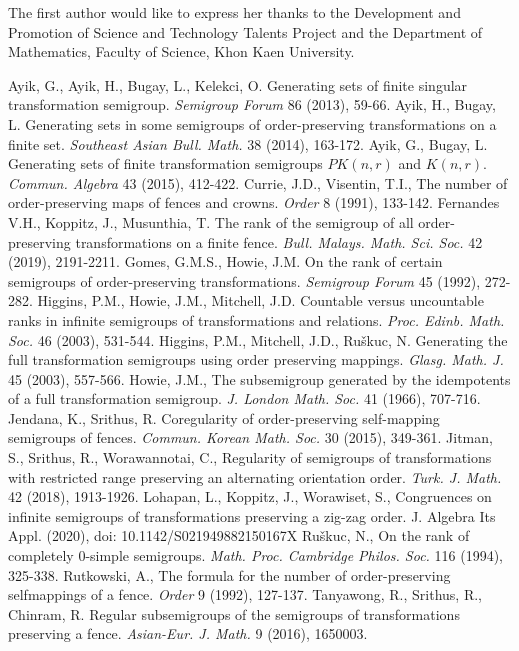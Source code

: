\documentclass[11pt]{article}
\theoremstyle{plain}
\theoremstyle{definition}
\begin{document}
The first author would like to express her thanks to the Development and Promotion of Science and Technology Talents Project and the Department of Mathematics, Faculty of Science, Khon Kaen University. %
\begin{thebibliography}{9}
 Ayik, G., Ayik, H., Bugay, L., Kelekci, O. Generating sets of finite singular transformation semigroup. \textit{Semigroup Forum} 86 (2013), 59-66.
 Ayik, H., Bugay, L. Generating sets in some semigroups of order-preserving transformations on a finite set. \textit{Southeast Asian Bull. Math.} 38 (2014), 163-172.
 Ayik, G., Bugay, L. Generating sets of finite transformation semigroups $PK(n,r)$ and $K(n,r).$ \textit{Commun. Algebra} 43 (2015), 412-422. Currie, J.D., Visentin, T.I., The number of order-preserving maps of fences and crowns. \textit{Order} 8 (1991), 133-142.
 Fernandes V.H., Koppitz, J., Musunthia, T. The rank of the semigroup of all order-preserving transformations on a finite fence. \textit{Bull. Malays. Math. Sci. Soc.} 42 (2019), 2191-2211.
 Gomes, G.M.S., Howie, J.M. On the rank of certain semigroups of order-preserving transformations. \textit{Semigroup Forum} 45 (1992), 272-282.
 Higgins, P.M., Howie, J.M., Mitchell, J.D. Countable versus uncountable ranks in infinite semigroups of transformations and relations. \textit{Proc. Edinb. Math. Soc.} 46 (2003), 531-544.
 Higgins, P.M., Mitchell, J.D., Ru\v{s}kuc, N. Generating the full transformation semigroups using order preserving mappings. \textit{Glasg. Math. J.} 45 (2003), 557-566.
 Howie, J.M., The subsemigroup generated by the idempotents of a full transformation semigroup. \textit{J. London Math. Soc.} 41 (1966), 707-716.
 Jendana, K., Srithus, R. Coregularity of order-preserving self-mapping semigroups of fences. \textit{Commun. Korean Math. Soc.} 30 (2015), 349-361.
 Jitman, S., Srithus, R., Worawannotai, C., Regularity of semigroups of transformations with restricted range preserving an alternating orientation order. \textit{Turk. J. Math.} 42 (2018), 1913-1926.
 Lohapan, L., Koppitz, J., Worawiset, S., Congruences on infinite semigroups of transformations preserving a zig-zag order. J. Algebra Its Appl. (2020), doi: 10.1142/S021949882150167X
 Ru\v{s}kuc, N., On the rank of completely $0$-simple semigroups. \textit{Math. Proc. Cambridge Philos. Soc.} 116 (1994), 325-338.
 Rutkowski, A., The formula for the number of order-preserving selfmappings of a fence. \textit{Order} 9 (1992), 127-137.  Tanyawong, R., Srithus, R., Chinram, R. Regular subsemigroups of the semigroups of transformations preserving a fence. \textit{Asian-Eur. J. Math.} 9 (2016), 1650003.
\end{thebibliography}
\end{document}
